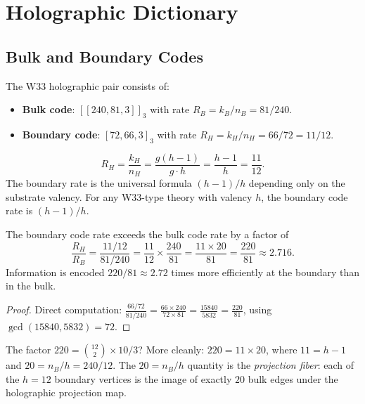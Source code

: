 \section{Holographic Dictionary}\label{sec:holo}

\subsection{Bulk and Boundary Codes}

The W33 holographic pair consists of:
\begin{itemize}
\item \textbf{Bulk code}: $[[240, 81, 3]]_3$ with rate $R_B = k_B/n_B = 81/240$.
\item \textbf{Boundary code}: $[72, 66, 3]_3$ with rate $R_H = k_H/n_H = 66/72 = 11/12$.
\end{itemize}

\begin{proposition}
\[
R_H = \frac{k_H}{n_H} = \frac{g(h-1)}{g \cdot h} = \frac{h-1}{h} = \frac{11}{12}.
\]
The boundary rate is the universal formula $(h-1)/h$ depending only
on the substrate valency. For any W33-type theory with valency $h$,
the boundary code rate is $(h-1)/h$.
\end{proposition}

\begin{theorem}\label{thm:holo}
The boundary code rate exceeds the bulk code rate by a factor of
\[
\frac{R_H}{R_B} = \frac{11/12}{81/240} = \frac{11}{12} \times \frac{240}{81}
= \frac{11 \times 20}{81} = \frac{220}{81} \approx 2.716.
\]
Information is encoded $220/81 \approx 2.72$ times more efficiently
at the boundary than in the bulk.
\end{theorem}

\begin{proof}
Direct computation:
$\frac{66/72}{81/240} = \frac{66 \times 240}{72 \times 81}
= \frac{15840}{5832} = \frac{220}{81}$,
using $\gcd(15840, 5832) = 72$.\end{proof}

\begin{remark}
The factor $220 = \binom{12}{2} \times 10/3$? More cleanly:
$220 = 11 \times 20$, where $11 = h-1$ and $20 = n_B / h = 240/12$.
The $20 = n_B/h$ quantity is the \emph{projection fiber}:
each of the $h = 12$ boundary vertices is the image of exactly
$20$ bulk edges under the holographic projection map.
\end{remark}

